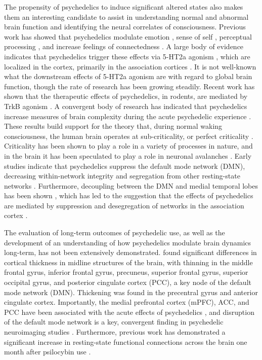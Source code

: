 The propensity of psychedelics to induce significant altered states also
makes them an interesting candidate to assist in understanding normal
and abnormal brain function and identifying the neural correlates of
consciousness. Previous work has showed that psychedelics modulate
emotion \parencite{Roseman2019}, sense of self \parencite{Lebedev2015}, perceptual processing \parencite{Kometer2016}, and
increase feelings of connectedness \parencite{Carhart-Harris2018b}. A large body
of evidence indicates that psychedelics trigger these effects via 5-HT2a
agonism \parencite{Nichols2016}, which are localized in the cortex, primarily in
the association cortices \parencite{Nichols2016,Weber2010}. It is not
well-known what the downstream effects of 5-HT2a agonism are with regard
to global brain function, though the rate of research has been growing
steadily. Recent work has shown that the therapeutic effects of
psychedelics, in rodents, are mediated by TrkB agonism \parencite{Moliner2023}. A convergent body of research has indicated that psychedelics
increase measures of brain complexity during the acute psychedelic
experience \parencite{Lebedev2016,Tagliazucchi2014,Viol2017}. These results build support for the theory that, during
normal waking consciousness, the human brain operates at
sub-criticality, or perfect criticality \parencite{Carhart-Harris2014}.
Criticality has been shown to play a role in a variety of processes in
nature, and in the brain it has been speculated to play a role in
neuronal avalanches \parencite{Beggs2003}. Early studies indicate that
psychedelics suppress the default mode network (DMN), decreasing
within-network integrity and segregation from other resting-state
networks \parencite{Buckner2008,Carhart-Harris2012,Johnson2019,Muller2018,Petri2014,Roseman2014,Tagliazucchi2014,Timmermann2023}. Furthermore,
decoupling between the DMN and medial temporal lobes has been shown
\parencite{Carhart-Harris2014}, which has led to the suggestion that the
effects of psychedelics are mediated by suppression and desegregation of
networks in the association cortex \parencite{Girn2022}.

The evaluation of long-term outcomes of psychedelic use, as well as the
development of an understanding of how psychedelics modulate brain
dynamics long-term, has not been extensively demonstrated. \textcite{Bouso2015} found significant differences in cortical thickness in midline
structures of the brain, with thinning in the middle frontal gyrus,
inferior frontal gyrus, precuneus, superior frontal gyrus, superior
occipital gyrus, and posterior cingulate cortex (PCC), a key node of the
default mode network (DMN). Thickening was found in
the precentral gyrus and anterior cingulate cortex. Importantly, the
medial prefrontal cortex (mPFC), ACC, and PCC have been associated with
the acute effects of psychedelics \parencite{Riba2006}, and disruption of
the default mode network is a key, convergent finding in psychedelic
neuroimaging studies \parencite{Carhart-Harris2017a,McCulloch2022}. Furthermore, previous work has demonstrated a significant
increase in resting-state functional connections across the brain one
month after psilocybin use \parencite{Barrett2020}.

